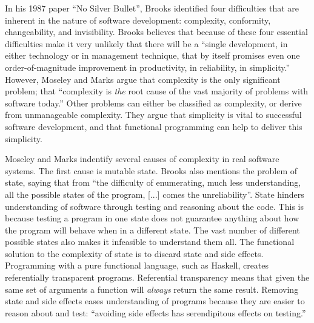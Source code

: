 In his 1987 paper ``No Silver Bullet'', Brooks identified four difficulties that
are inherent in the nature of software development: complexity, conformity,
changeability, and invisibility.\cite{brooks1987bullet} Brooks believes that
because of these four essential difficulties make it very unlikely that there
will be a ``single development, in either technology or in management technique,
that by itself promises even one order-of-magnitude improvement in productivity,
in reliability, in simplicity.'' However, Moseley and Marks argue that complexity
is the only significant problem; that ``complexity is \emph{the} root cause of the
vast majority of problems with software today.''\cite{moseley2006tarpit} Other
problems can either be classified as complexity, or derive from unmanageable
complexity. They argue that simplicity is vital to successful software development,
and that functional programming can help to deliver this simplicity.

Moseley and Marks indentify several causes of complexity in real software systems.
The first cause is mutable state. Brooks also mentions the problem of state,
saying that from ``the difficulty of enumerating, much less understanding, all
the possible states of the program, [...] comes the unreliability''.\cite{brooks1987bullet}
State hinders understanding of software through testing and reasoning about the code.
This is because testing a program in one state does not guarantee anything about
how the program will behave when in a different state. The vast number of different
possible states also makes it infeasible to understand them all. The functional
solution to the complexity of state is to discard state and side effects.
Programming with a pure functional language, such as Haskell, creates referentially
transparent programs. Referential transparency means that given the same set of
arguments a function will \emph{always} return the same result. Removing state
and side effects eases understanding of programs because they are easier to
reason about and test: ``avoiding side effects has serendipitous effects on testing.''\cite{smallbone2011}

